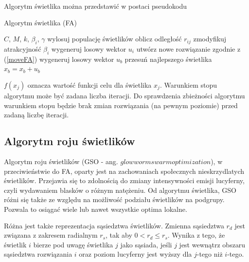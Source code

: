 \documentclass[11pt,a4paper,twoside]{article}
\begin{document}
Algorytm świetlika można przedstawić w postaci pseudokodu

\begin{algorithm}[ht]
\caption{Algorytm świetlika (FA)}
\label{FA}
\begin{algorithmic}%
\Require $C$, $M$, $k$, $\beta_{i}$, $\gamma$
	\State wylosuj populację świetlików
				\State oblicz odległość $r_{ij}$
				\State zmodyfikuj atrakcyjność $\beta_{i}$
				\State wygeneruj losowy wektor $u_{i}$
				\State utwórz nowe rozwiązanie zgodnie z (\ref{moveFA})
    		\EndIf
		\EndFor
	\EndFor	
	\State wygeneruj losowy wektor $u_{b}$
	\State przesuń najlepszego świetlika $x_{b} = x_{b} + u_{b}$
	\EndWhile	
\end{algorithmic}
\end{algorithm}

$f(x_{j})$ oznacza wartość funkcji celu dla świetlika $x_{j}$. Warunkiem stopu algorytmu może być zadana liczba iteracji. Do sprawdzenia zbieżności algorytmu warunkiem stopu będzie brak zmian rozwiązania (na pewnym poziomie) przed zadaną liczbę iteracji.

\clearpage
\subsection{Algorytm roju świetlików}
Algorytm roju świetlików (GSO - ang. $glowworm swarm optimization$), w przeciwieństwie do FA, oparty jest na zachowaniach społecznych nieskrzydlatych świetlików. Przejawia się to zdolnością do zmiany intensywności emisji lucyferny, czyli wydawaniem blasków o różnym natężeniu. Od algorytmu świetlika, GSO różni się także ze względu na możliwość podziału świetlików na podgrupy. Pozwala to osiągać wiele lub nawet wszystkie optima lokalne.

Różna jest także reprezentacja sąsiedztwa świetlików. Zmienna sąsiedztwa $r_{d}$ jest związana z zakresem radialnym $r_{s}$, tak aby $0 < r_{d} \leq r_{s}$. Wynika z tego, że świetlik $i$ bierze pod uwagę świetlika $j$ jako sąsiada, jeśli $j$ jest wewnątrz obszaru sąsiedztwa rozwiązania $i$ oraz poziom lucyferny jest wyższy dla $j$-tego niż $i$-tego.
\end{document}
